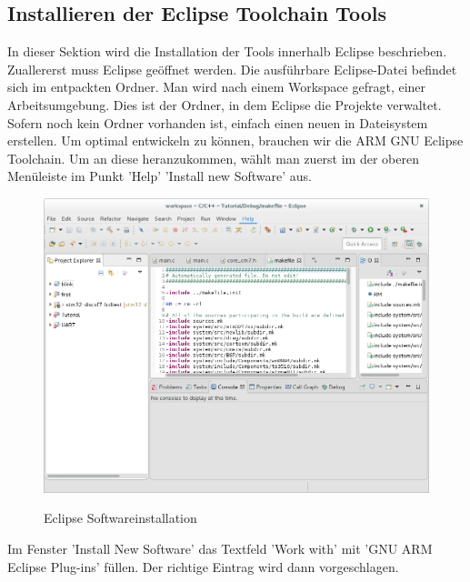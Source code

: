 \documentclass[12pt,a4paper]{article}
\begin{document}
\subsection{Installieren der Eclipse Toolchain Tools}
In dieser Sektion wird die Installation der Tools innerhalb Eclipse beschrieben.
Zuallererst muss Eclipse geöffnet werden. Die ausführbare Eclipse-Datei befindet sich im entpackten Ordner.
Man wird nach einem Workspace gefragt, einer Arbeitsumgebung. Dies ist der Ordner, in dem Eclipse die Projekte verwaltet. Sofern noch kein Ordner vorhanden ist, einfach einen neuen in Dateisystem erstellen.
Um optimal entwickeln zu können, brauchen wir die ARM GNU Eclipse Toolchain. Um an diese heranzukommen, wählt man zuerst im der oberen Menüleiste im Punkt 'Help' 'Install new Software' aus.
\begin{figure}[h]
\begin{center}
\includegraphics[width=12cm]{grafiken/debugger/EclipseNewSoftware.png}
\label{eclipse_softwareinstallation}
\caption{Eclipse Softwareinstallation}
\end{center}
\end{figure}
Im Fenster 'Install New Software' das Textfeld 'Work with' mit 'GNU ARM Eclipse Plug-ins' füllen. Der richtige Eintrag wird dann vorgeschlagen.
\end{document}
